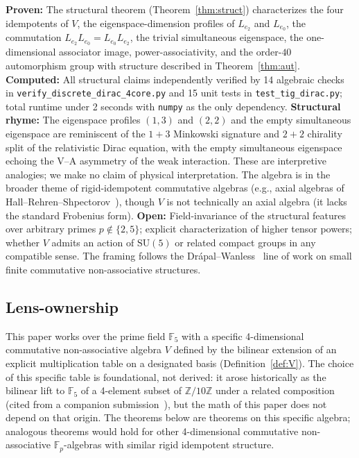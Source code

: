 \documentclass[11pt,reqno]{amsart}
\theoremstyle{plain}
\theoremstyle{definition}
\theoremstyle{remark}
\newcommand{\Z}{\mathbb{Z}}
\newcommand{\F}{\mathbb{F}}
\begin{document}
\textbf{Proven:} The structural theorem (Theorem~\ref{thm:struct}) characterizes the four idempotents of $V$, the eigenspace-dimension profiles of $L_{e_2}$ and $L_{e_0}$, the commutation $L_{e_2} L_{e_0} = L_{e_0} L_{e_2}$, the trivial simultaneous eigenspace, the one-dimensional associator image, power-associativity, and the order-$40$ automorphism group with structure described in Theorem~\ref{thm:aut}. \textbf{Computed:} All structural claims independently verified by 14 algebraic checks in \texttt{verify\_discrete\_dirac\_4core.py} and 15 unit tests in \texttt{test\_tig\_dirac.py}; total runtime under 2 seconds with \texttt{numpy} as the only dependency. \textbf{Structural rhyme:} The eigenspace profiles $(1, 3)$ and $(2, 2)$ and the empty simultaneous eigenspace are reminiscent of the $1+3$ Minkowski signature and $2+2$ chirality split of the relativistic Dirac equation, with the empty simultaneous eigenspace echoing the V--A asymmetry of the weak interaction. These are interpretive analogies; we make no claim of physical interpretation. The algebra is in the broader theme of rigid-idempotent commutative algebras (e.g., axial algebras of Hall--Rehren--Shpectorov~\cite{HallRehrenShpectorov2015}), though $V$ is not technically an axial algebra (it lacks the standard Frobenius form). \textbf{Open:} Field-invariance of the structural features over arbitrary primes $p \notin \{2, 5\}$; explicit characterization of higher tensor powers; whether $V$ admits an action of $\mathrm{SU}(5)$ or related compact groups in any compatible sense. The framing follows the Drápal--Wanless~\cite{DrapalWanless2021} line of work on small finite commutative non-associative structures.

\subsection{Lens-ownership}

This paper works over the prime field $\F_5$ with a specific 4-dimensional commutative non-associative algebra $V$ defined by the bilinear extension of an explicit multiplication table on a designated basis (Definition~\ref{def:V}). The choice of this specific table is foundational, not derived: it arose historically as the bilinear lift to $\F_5$ of a 4-element subset of $\Z/10\Z$ under a related composition (cited from a companion submission~\cite{SandersGishFourCore}), but the math of this paper does not depend on that origin. The theorems below are theorems on this specific algebra; analogous theorems would hold for other 4-dimensional commutative non-associative $\F_p$-algebras with similar rigid idempotent structure.
\end{document}
